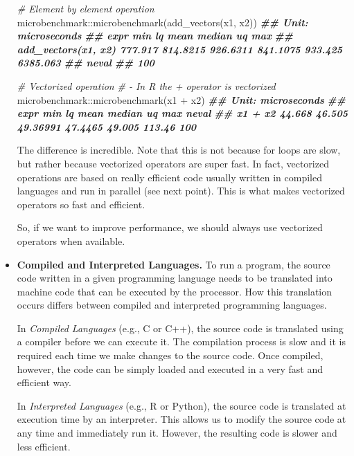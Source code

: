 \documentclass[
  11pt,
]{book}
\newenvironment{Shaded}{\begin{snugshade}}{\end{snugshade}}
\newcommand{\CommentTok}[1]{\textcolor[rgb]{0.56,0.35,0.01}{\textit{#1}}}
\newcommand{\DocumentationTok}[1]{\textcolor[rgb]{0.56,0.35,0.01}{\textbf{\textit{#1}}}}
\newcommand{\FunctionTok}[1]{\textcolor[rgb]{0.00,0.00,0.00}{#1}}
\newcommand{\NormalTok}[1]{#1}
\newcommand{\SpecialCharTok}[1]{\textcolor[rgb]{0.00,0.00,0.00}{#1}}
\begin{document}
\begin{itemize}
\begin{Shaded}
\begin{Highlighting}[]
\CommentTok{\# Element by element operation}
\NormalTok{microbenchmark}\SpecialCharTok{::}\FunctionTok{microbenchmark}\NormalTok{(}\FunctionTok{add\_vectors}\NormalTok{(x1, x2))}
\DocumentationTok{\#\# Unit: microseconds}
\DocumentationTok{\#\#                 expr     min       lq     mean   median      uq      max}
\DocumentationTok{\#\#  add\_vectors(x1, x2) 777.917 814.8215 926.6311 841.1075 933.425 6385.063}
\DocumentationTok{\#\#  neval}
\DocumentationTok{\#\#    100}

\CommentTok{\# Vectorized operation}
\CommentTok{\# {-} In R the \textasciigrave{}+\textasciigrave{} operator is vectorized}
\NormalTok{microbenchmark}\SpecialCharTok{::}\FunctionTok{microbenchmark}\NormalTok{(x1 }\SpecialCharTok{+}\NormalTok{ x2)}
\DocumentationTok{\#\# Unit: microseconds}
\DocumentationTok{\#\#     expr    min     lq     mean  median     uq    max neval}
\DocumentationTok{\#\#  x1 + x2 44.668 46.505 49.36991 47.4465 49.005 113.46   100}
\end{Highlighting}
\end{Shaded}

  The difference is incredible. Note that this is not because for loops are slow, but rather because vectorized operators are super fast. In fact, vectorized operations are based on really efficient code usually written in compiled languages and run in parallel (see next point). This is what makes vectorized operators so fast and efficient.

  So, if we want to improve performance, we should always use vectorized operators when available.
\item
  \textbf{Compiled and Interpreted Languages.} To run a program, the source code written in a given programming language needs to be translated into machine code that can be executed by the processor. How this translation occurs differs between compiled and interpreted programming languages.

  In \emph{Compiled Languages} (e.g., C or C++), the source code is translated using a compiler before we can execute it. The compilation process is slow and it is required each time we make changes to the source code. Once compiled, however, the code can be simply loaded and executed in a very fast and efficient way.

  In \emph{Interpreted Languages} (e.g., R or Python), the source code is translated at execution time by an interpreter. This allows us to modify the source code at any time and immediately run it. However, the resulting code is slower and less efficient.


\end{itemize}
\end{document}
